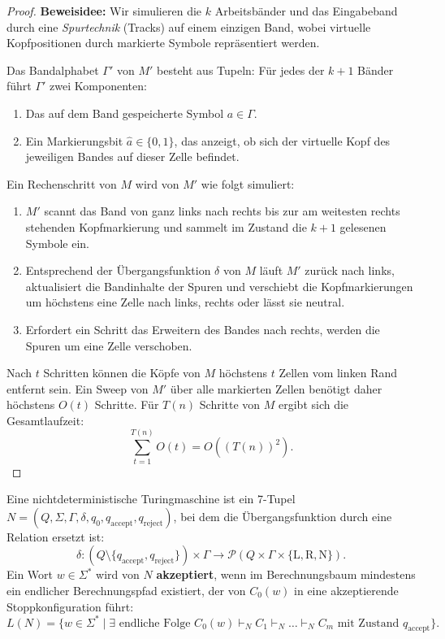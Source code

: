 \begin{proof}
    \textbf{Beweisidee:} Wir simulieren die $k$ Arbeitsbänder und das Eingabeband durch eine \emph{Spurtechnik} (Tracks) auf einem einzigen Band, wobei virtuelle Kopfpositionen durch markierte Symbole repräsentiert werden.
    
    Das Bandalphabet $\Gamma'$ von $M'$ besteht aus Tupeln: Für jedes der $k+1$ Bänder führt $\Gamma'$ zwei Komponenten:
    \begin{enumerate}
        \item Das auf dem Band gespeicherte Symbol $a \in \Gamma$.
        \item Ein Markierungsbit $\hat{a} \in \{0, 1\}$, das anzeigt, ob sich der virtuelle Kopf des jeweiligen Bandes auf dieser Zelle befindet.
    \end{enumerate}
    Ein Rechenschritt von $M$ wird von $M'$ wie folgt simuliert:
    \begin{enumerate}
        \item $M'$ scannt das Band von ganz links nach rechts bis zur am weitesten rechts stehenden Kopfmarkierung und sammelt im Zustand die $k+1$ gelesenen Symbole ein.
        \item Entsprechend der Übergangsfunktion $\delta$ von $M$ läuft $M'$ zurück nach links, aktualisiert die Bandinhalte der Spuren und verschiebt die Kopfmarkierungen um höchstens eine Zelle nach links, rechts oder lässt sie neutral.
        \item Erfordert ein Schritt das Erweitern des Bandes nach rechts, werden die Spuren um eine Zelle verschoben.
    \end{enumerate}
    Nach $t$ Schritten können die Köpfe von $M$ höchstens $t$ Zellen vom linken Rand entfernt sein. Ein Sweep von $M'$ über alle markierten Zellen benötigt daher höchstens $O(t)$ Schritte. Für $T(n)$ Schritte von $M$ ergibt sich die Gesamtlaufzeit:
    \[
        \sum_{t=1}^{T(n)} O(t) = O((T(n))^2).
    \]
\end{proof}

\begin{definition}
    Eine nichtdeterministische Turingmaschine ist ein 7-Tupel $N = (Q, \Sigma, \Gamma, \delta, q_0, q_{\mathrm{accept}}, q_{\mathrm{reject}})$, bei dem die Übergangsfunktion durch eine Relation ersetzt ist:
    \[
        \delta : (Q \setminus \{q_{\mathrm{accept}}, q_{\mathrm{reject}}\}) \times \Gamma \to \mathcal{P}(Q \times \Gamma \times \{\mathrm{L}, \mathrm{R}, \mathrm{N}\}).
    \]
    Ein Wort $w \in \Sigma^*$ wird von $N$ \textbf{akzeptiert}, wenn im Berechnungsbaum mindestens ein endlicher Berechnungspfad existiert, der von $C_0(w)$ in eine akzeptierende Stoppkonfiguration führt:
    \[
        L(N) = \{w \in \Sigma^* \mid \exists \text{ endliche Folge } C_0(w) \vdash_N C_1 \vdash_N \dots \vdash_N C_m \text{ mit Zustand } q_{\mathrm{accept}}\}.
    \]
\end{definition}

